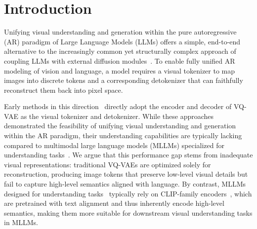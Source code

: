 \section{Introduction}
\label{sec:intro}

Unifying visual understanding and generation within the pure autoregressive (AR) paradigm of Large Language Models (LLMs) offers a simple, end-to-end alternative to the increasingly common yet structurally complex approach of coupling LLMs with external diffusion modules~\citep{dong2024dreamllm,huang2025illume+,metaquery,blip3o}. To enable fully unified AR modeling of vision and language, a model requires a visual tokenizer to map images into discrete tokens and a corresponding detokenizer that can faithfully reconstruct them back into pixel space.



Early methods in this direction~\citep{yu2023CM3leon,team2024chameleon,wang2024emu3} directly adopt the encoder and decoder of VQ-VAE as the visual tokenizer and detokenizer. While these approaches demonstrated the feasibility of unifying visual understanding and generation within the AR paradigm, their understanding capabilities are typically lacking compared to multimodal large language models (MLLMs) specialized for understanding tasks~\citep{liu2023mmbench,yue2023mmmu,fu2024mme,song2024m3gia}.
We argue that this performance gap stems from inadequate visual representations: traditional VQ-VAEs are optimized solely for reconstruction, producing image tokens that preserve low-level visual details but fail to capture high-level semantics aligned with language. By contrast, MLLMs designed for understanding tasks~\citep{liu2024llavanext,chen2024sharegpt4v,li2024baichuanomni,li2025baichuanomni1d5,qwen2d5vl} typically rely on CLIP-family encoders~\citep{radford2021clip,zhai2023siglip}, which are pretrained with text alignment and thus inherently encode high-level semantics, making them more suitable for downstream visual understanding tasks in MLLMs.

